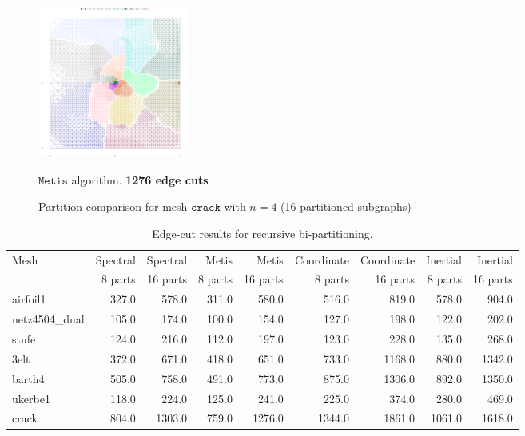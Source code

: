\documentclass[unicode,11pt,a4paper,oneside,numbers=endperiod,openany]{scrartcl}
\begin{document}
\begin{figure}[h!]
\begin{minipage}{0.5\textwidth}
        \centering
        \includegraphics[height=5cm]{fig/plot/recursive/recursive-crack-metis-p16-cut_1276.0}
        \caption{$\texttt {Metis}$ algorithm. \textbf{1276 edge cuts}}
    \end{minipage}
    \caption*{Partition comparison for mesh $\texttt {crack}$ with $n=4$ (16 partitioned subgraphs)}
\end{figure}


\begin{table}[h!]
\caption{Edge-cut results for recursive bi-partitioning.}
\begin{tabular}{l|r|r|r|r|r|r|r|r} \hline\hline 
          Mesh & Spectral & Spectral &   Metis &    Metis & Coordinate & Coordinate & Inertial & Inertial \\
               &  8 parts & 16 parts & 8 parts & 16 parts &    8 parts &   16 parts &  8 parts & 16 parts \\
\hline
      airfoil1 &    327.0 &    578.0 &   311.0 &    580.0 &      516.0 &      819.0 &    578.0 &    904.0 \\
 netz4504\_dual &    105.0 &    174.0 &   100.0 &    154.0 &      127.0 &      198.0 &    122.0 &    202.0 \\
         stufe &    124.0 &    216.0 &   112.0 &    197.0 &      123.0 &      228.0 &    135.0 &    268.0 \\
          3elt &    372.0 &    671.0 &   418.0 &    651.0 &      733.0 &     1168.0 &    880.0 &   1342.0 \\
        barth4 &    505.0 &    758.0 &   491.0 &    773.0 &      875.0 &     1306.0 &    892.0 &   1350.0 \\
       ukerbe1 &    118.0 &    224.0 &   125.0 &    241.0 &      225.0 &      374.0 &    280.0 &    469.0 \\
         crack &    804.0 &   1303.0 &   759.0 &   1276.0 &     1344.0 &     1861.0 &   1061.0 &   1618.0 \\


 \hline \hline
\end{tabular}
\label{table:Rec_bisection}
\end{table}
\end{document}

